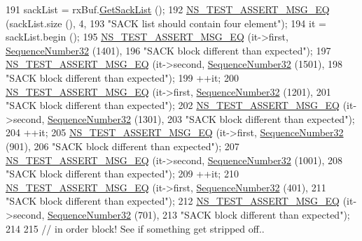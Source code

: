 \begin{DoxyCode}
191   sackList = rxBuf.\hyperlink{classns3_1_1TcpRxBuffer_afc5d672da4595330754de1bb3933a9c7}{GetSackList} ();
192   \hyperlink{group__testing_ga2a9d78cffb3db8e867c35fff0b698cf5}{NS\_TEST\_ASSERT\_MSG\_EQ} (sackList.size (), 4,
193                          \textcolor{stringliteral}{"SACK list should contain four element"});
194   it = sackList.begin ();
195   \hyperlink{group__testing_ga2a9d78cffb3db8e867c35fff0b698cf5}{NS\_TEST\_ASSERT\_MSG\_EQ} (it->first, \hyperlink{classns3_1_1SequenceNumber}{SequenceNumber32} (1401),
196                          \textcolor{stringliteral}{"SACK block different than expected"});
197   \hyperlink{group__testing_ga2a9d78cffb3db8e867c35fff0b698cf5}{NS\_TEST\_ASSERT\_MSG\_EQ} (it->second, \hyperlink{classns3_1_1SequenceNumber}{SequenceNumber32} (1501),
198                          \textcolor{stringliteral}{"SACK block different than expected"});
199   ++it;
200   \hyperlink{group__testing_ga2a9d78cffb3db8e867c35fff0b698cf5}{NS\_TEST\_ASSERT\_MSG\_EQ} (it->first, \hyperlink{classns3_1_1SequenceNumber}{SequenceNumber32} (1201),
201                          \textcolor{stringliteral}{"SACK block different than expected"});
202   \hyperlink{group__testing_ga2a9d78cffb3db8e867c35fff0b698cf5}{NS\_TEST\_ASSERT\_MSG\_EQ} (it->second, \hyperlink{classns3_1_1SequenceNumber}{SequenceNumber32} (1301),
203                          \textcolor{stringliteral}{"SACK block different than expected"});
204   ++it;
205   \hyperlink{group__testing_ga2a9d78cffb3db8e867c35fff0b698cf5}{NS\_TEST\_ASSERT\_MSG\_EQ} (it->first, \hyperlink{classns3_1_1SequenceNumber}{SequenceNumber32} (901),
206                          \textcolor{stringliteral}{"SACK block different than expected"});
207   \hyperlink{group__testing_ga2a9d78cffb3db8e867c35fff0b698cf5}{NS\_TEST\_ASSERT\_MSG\_EQ} (it->second, \hyperlink{classns3_1_1SequenceNumber}{SequenceNumber32} (1001),
208                          \textcolor{stringliteral}{"SACK block different than expected"});
209   ++it;
210   \hyperlink{group__testing_ga2a9d78cffb3db8e867c35fff0b698cf5}{NS\_TEST\_ASSERT\_MSG\_EQ} (it->first, \hyperlink{classns3_1_1SequenceNumber}{SequenceNumber32} (401),
211                          \textcolor{stringliteral}{"SACK block different than expected"});
212   \hyperlink{group__testing_ga2a9d78cffb3db8e867c35fff0b698cf5}{NS\_TEST\_ASSERT\_MSG\_EQ} (it->second, \hyperlink{classns3_1_1SequenceNumber}{SequenceNumber32} (701),
213                          \textcolor{stringliteral}{"SACK block different than expected"});
214 
215   \textcolor{comment}{// in order block! See if something get stripped off..}

\end{DoxyCode}

